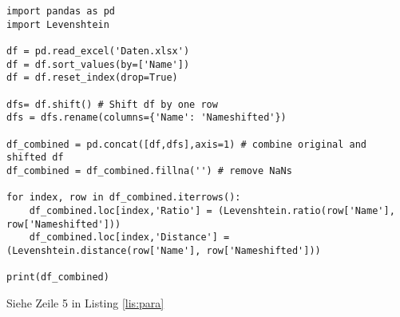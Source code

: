 \documentclass[12pt,ngerman]{scrartcl}
\begin{document}
\begin{lstlisting}[label={lis:para},caption={Hallo Listings}]
import pandas as pd
import Levenshtein
 
df = pd.read_excel('Daten.xlsx')
df = df.sort_values(by=['Name'])
df = df.reset_index(drop=True)
 
dfs= df.shift() # Shift df by one row
dfs = dfs.rename(columns={'Name': 'Nameshifted'})
 
df_combined = pd.concat([df,dfs],axis=1) # combine original and shifted df
df_combined = df_combined.fillna('') # remove NaNs
 
for index, row in df_combined.iterrows():
    df_combined.loc[index,'Ratio'] = (Levenshtein.ratio(row['Name'], row['Nameshifted']))
    df_combined.loc[index,'Distance'] = (Levenshtein.distance(row['Name'], row['Nameshifted']))    
 
print(df_combined)
\end{lstlisting}



Siehe Zeile 5 in Listing \ref{lis:para}


\end{document}
